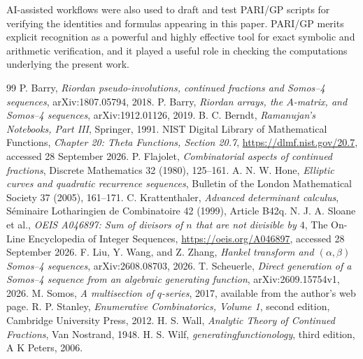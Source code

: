 \documentclass[11pt]{article}
\numberwithin{equation}{section}
\begin{document}
AI-assisted workflows were also used to draft and test PARI/GP scripts for
verifying the identities and formulas appearing in this paper.  PARI/GP
merits explicit recognition as a powerful and highly effective tool for exact
symbolic and arithmetic verification, and it played a useful role in checking
the computations underlying the present work.

\begin{thebibliography}{99}
 P. Barry, \emph{Riordan pseudo-involutions, continued fractions and Somos--4 sequences}, arXiv:1807.05794, 2018.
 P. Barry, \emph{Riordan arrays, the $A$-matrix, and Somos--4 sequences}, arXiv:1912.01126, 2019.
 B. C. Berndt, \emph{Ramanujan's Notebooks, Part III}, Springer, 1991.
 NIST Digital Library of Mathematical Functions, \emph{Chapter 20: Theta Functions, Section 20.7}, \url{https://dlmf.nist.gov/20.7}, accessed 28 September 2026.
 P. Flajolet, \emph{Combinatorial aspects of continued fractions}, Discrete Mathematics 32 (1980), 125--161.
 A. N. W. Hone, \emph{Elliptic curves and quadratic recurrence sequences}, Bulletin of the London Mathematical Society 37 (2005), 161--171.
 C. Krattenthaler, \emph{Advanced determinant calculus}, S\'eminaire Lotharingien de Combinatoire 42 (1999), Article B42q.
 N. J. A. Sloane et al., \emph{OEIS A046897: Sum of divisors of $n$ that are not divisible by $4$}, The On-Line Encyclopedia of Integer Sequences, \url{https://oeis.org/A046897}, accessed 28 September 2026.
 F. Liu, Y. Wang, and Z. Zhang, \emph{Hankel transform and $(\alpha,\beta)$ Somos--4 sequences}, arXiv:2608.08703, 2026.
 T. Scheuerle, \emph{Direct generation of a Somos--4 sequence from an algebraic generating function}, arXiv:2609.15754v1, 2026.
 M. Somos, \emph{A multisection of $q$-series}, 2017, available from the author's web page.
 R. P. Stanley, \emph{Enumerative Combinatorics, Volume 1}, second edition, Cambridge University Press, 2012.
 H. S. Wall, \emph{Analytic Theory of Continued Fractions}, Van Nostrand, 1948.
 H. S. Wilf, \emph{generatingfunctionology}, third edition, A K Peters, 2006.
\end{thebibliography}
\end{document}
